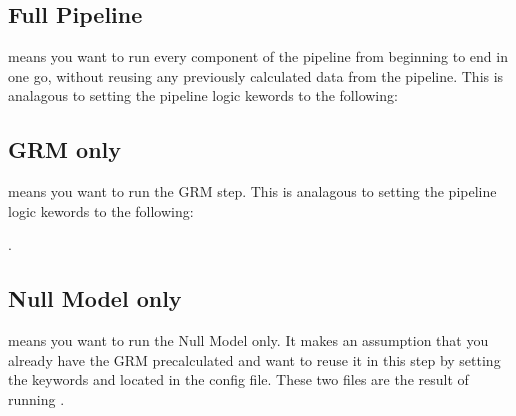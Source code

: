 \documentclass[letterpaper,10pt,english]{sphinxmanual}
\begin{document}
\subsection{Full Pipeline}
\label{\detokenize{exampleWorkFlows:full-pipeline}}
 means you want to run every component of the pipeline from beginning to end in one go, without re\sphinxhyphen{}using any previously calculated data from the pipeline.  This is analagous to setting the pipeline logic kewords to the following:

\begin{sphinxVerbatim}[commandchars=\\\{\}]
\end{sphinxVerbatim}


\subsection{GRM only}
\label{\detokenize{exampleWorkFlows:grm-only}}
 means you want to run the GRM step.  This is analagous to setting the pipeline logic kewords to the following:

         .

\begin{sphinxVerbatim}[commandchars=\\\{\}]
\end{sphinxVerbatim}


\subsection{Null Model only}
\label{\detokenize{exampleWorkFlows:null-model-only}}
 means you want to run the Null Model only.  It makes an assumption that you already have the GRM pre\sphinxhyphen{}calculated and want to re\sphinxhyphen{}use it in this step by setting the keywords  and  located in the config file.  These two files are the result of running .
\end{document}
